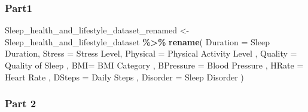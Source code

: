 \documentclass[
  11pt,
]{article}
\newenvironment{Shaded}{\begin{snugshade}}{\end{snugshade}}
\newcommand{\AttributeTok}[1]{\textcolor[rgb]{0.13,0.29,0.53}{#1}}
\newcommand{\FunctionTok}[1]{\textcolor[rgb]{0.13,0.29,0.53}{\textbf{#1}}}
\newcommand{\NormalTok}[1]{#1}
\newcommand{\OtherTok}[1]{\textcolor[rgb]{0.56,0.35,0.01}{#1}}
\newcommand{\SpecialCharTok}[1]{\textcolor[rgb]{0.81,0.36,0.00}{\textbf{#1}}}
\newcommand{\StringTok}[1]{\textcolor[rgb]{0.31,0.60,0.02}{#1}}
\begin{document}
\hypertarget{part1}{%
\subsubsection{Part1}\label{part1}}

\begin{Shaded}
\begin{Highlighting}[]
\NormalTok{Sleep\_health\_and\_lifestyle\_dataset\_renamed }\OtherTok{\textless{}{-}}\NormalTok{ Sleep\_health\_and\_lifestyle\_dataset }\SpecialCharTok{\%\textgreater{}\%}
  \FunctionTok{rename}\NormalTok{( }\AttributeTok{Duration =} \StringTok{\textquotesingle{}Sleep Duration\textquotesingle{}}\NormalTok{,}
          \AttributeTok{Stress =} \StringTok{\textquotesingle{}Stress Level\textquotesingle{}}\NormalTok{,}
          \AttributeTok{Physical =} \StringTok{\textquotesingle{}Physical Activity Level\textquotesingle{}}\NormalTok{ ,}
          \AttributeTok{Quality =} \StringTok{\textquotesingle{}Quality of Sleep\textquotesingle{}}\NormalTok{ ,}
          \AttributeTok{BMI=} \StringTok{\textquotesingle{}BMI Category\textquotesingle{}}\NormalTok{ ,}
          \AttributeTok{BPressure =} \StringTok{\textquotesingle{}Blood Pressure\textquotesingle{}}\NormalTok{ ,}
          \AttributeTok{HRate =} \StringTok{\textquotesingle{}Heart Rate\textquotesingle{}}\NormalTok{ ,}
          \AttributeTok{DSteps =} \StringTok{\textquotesingle{}Daily Steps\textquotesingle{}}\NormalTok{ ,}
          \AttributeTok{Disorder =} \StringTok{\textquotesingle{}Sleep Disorder\textquotesingle{}}\NormalTok{ )}
\end{Highlighting}
\end{Shaded}

\hypertarget{part-2}{%
\subsubsection{Part 2}\label{part-2}}
\end{document}
